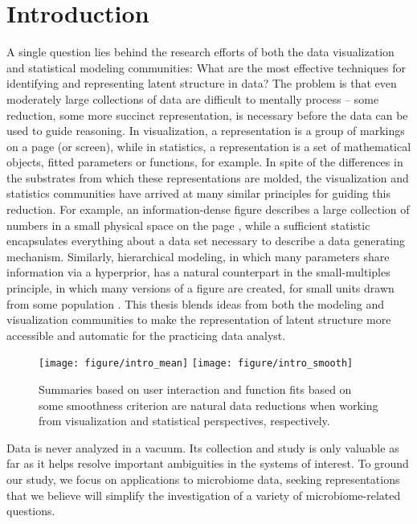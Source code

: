 \chapter{Introduction}
\label{ch:introduction}

A single question lies behind the research efforts of both the data
visualization and statistical modeling communities: What are the most effective
techniques for identifying and representing latent structure in data? The
problem is that even moderately large collections of data are difficult to
mentally process -- some reduction, some more succinct representation, is
necessary before the data can be used to guide reasoning. In visualization, a
representation is a group of markings on a page (or screen), while in
statistics, a representation is a set of mathematical objects, fitted parameters
or functions, for example. In spite of the differences in the substrates from
which these representations are molded, the visualization and statistics
communities have arrived at many similar principles for guiding this reduction.
For example, an information-dense figure describes a large collection of numbers
in a small physical space on the page \citep{tufte2014visual}, while a
sufficient statistic encapsulates everything about a data set necessary to
describe a data generating mechanism. Similarly, hierarchical modeling, in which
many parameters share information via a hyperprior, has a natural counterpart in
the small-multiples principle, in which many versions of a figure are created,
for small units drawn from some population \citep{gelman2004exploratory}. This
thesis blends ideas from both the modeling and visualization communities to make
the representation of latent structure more accessible and automatic for the
practicing data analyst.

\begin{figure}
  \centering
  \texttt{[image: figure/intro\_mean]}
  \texttt{[image: figure/intro\_smooth]}
  \caption{Summaries based on user interaction and function fits based on some
    smoothness criterion are natural data reductions when working from
    visualization and statistical perspectives, respectively.}
\end{figure}

Data is never analyzed in a vacuum. Its collection and study is only valuable
as far as it helps resolve important ambiguities in the systems of interest. To
ground our study, we focus on applications to microbiome data, seeking
representations that we believe will simplify the investigation of a variety of
microbiome-related questions.

